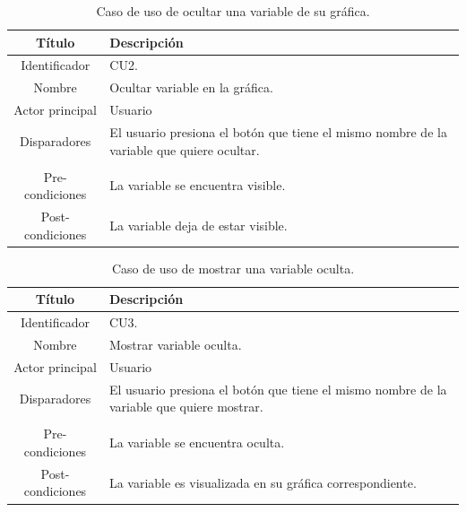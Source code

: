 \begin{table}[htpb]
	\centering
	\caption{Caso de uso de ocultar una variable de su gráfica.}
	\centering
	\begin{tabular}{c p{}}    
		\toprule
		\textbf{Título }     & \textbf{Descripción} \\
		\midrule
		Identificador		&  CU2. \\
		Nombre				&   Ocultar variable en la gráfica. \\
		Actor principal		&   Usuario \\
		Disparadores		&   El usuario presiona el botón que tiene el mismo nombre de la variable que quiere ocultar. \\
\\
		Pre-condiciones		&   La variable se encuentra visible. \\
		Post-condiciones	&   La variable deja de estar visible.\\
		\bottomrule
	\end{tabular}
\label{tab:caso-ocultar}
\end{table}

\begin{table}[htpb]
	\centering
	\caption{Caso de uso de mostrar una variable oculta.}
	\centering
	\begin{tabular}{c p{}}    
		\toprule
		\textbf{Título }     & \textbf{Descripción} \\
		\midrule
		Identificador		&	CU3. \\
		Nombre				& 	Mostrar variable oculta. \\
		Actor principal		&   Usuario \\
		Disparadores		&   El usuario presiona el botón que tiene el mismo nombre de la variable que quiere mostrar. \\
\\
		Pre-condiciones		&   La variable se encuentra oculta. \\
		Post-condiciones	&   La variable es visualizada en su gráfica correspondiente.\\
		\bottomrule
	\end{tabular}
\label{tab:caso-mostrar}
\end{table}

